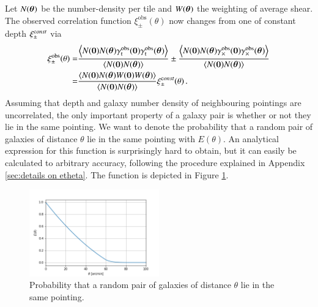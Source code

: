 Let $N(\b \theta)$ be the number-density per tile and $W(\b \theta)$ the weighting of average shear. The observed correlation function $\xi^{\text{obs}}_\pm(\theta)$ now changes from one of constant depth $\xi_\pm^{\rm const}$ via 
\begin{align*}
\xi^{\text{obs}}_\pm(\theta) = & \frac{\la N(\b 0)N(\b \theta)\gammao_{\rm t}(\b 0)\gammao_{\rm t}(\b \theta)\ra }{\la N(\b 0)N(\b \theta)\ra} \pm \frac{\la N(\b 0)N(\b \theta)\gammao_\times(\b 0)\gammao_\times(\b \theta)\ra }{\la N(\b 0)N(\b \theta)\ra} \\
 = & \frac{\la N(\b 0)N(\b \theta)W(\b 0)W(\b \theta)\ra}{\la N(\b 0)N(\b \theta)\ra} \xi_{\pm}^{\rm const}(\theta) \, .
 \end{align*}
 Assuming that depth and galaxy number density of neighbouring pointings are uncorrelated, the only important property of a galaxy pair is whether or not they lie in the same pointing. We want to denote the probability that a random pair of galaxies of distance $\theta$ lie in the same pointing with $E(\theta)$. An analytical expression for this function is surprisingly hard to obtain, but it can easily be calculated to arbitrary accuracy, following the procedure explained in Appendix \ref{sec:details on etheta}. The function is depicted in Figure \ref{fig:eoftheta_lin}. 
 
 \begin{figure}
 \centering
 \includegraphics[width=0.5\textwidth]{images/eoftheta.png}
 \caption{Probability that a random pair of galaxies of distance $\theta$ lie in the same pointing.}
 \label{fig:eoftheta_lin}
 \end{figure}

